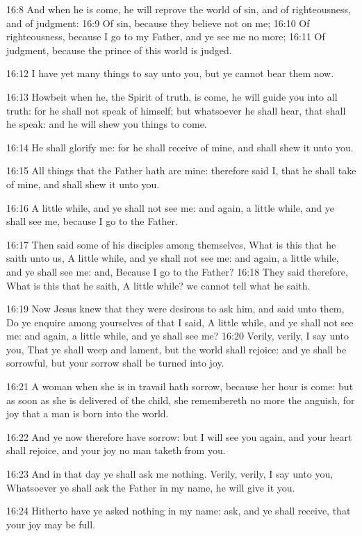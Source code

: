16:8 And when he is come, he will reprove the world of sin, and of
righteousness, and of judgment: 16:9 Of sin, because they believe not
on me; 16:10 Of righteousness, because I go to my Father, and ye see
me no more; 16:11 Of judgment, because the prince of this world is
judged.

16:12 I have yet many things to say unto you, but ye cannot bear them
now.

16:13 Howbeit when he, the Spirit of truth, is come, he will guide you
into all truth: for he shall not speak of himself; but whatsoever he
shall hear, that shall he speak: and he will shew you things to come.

16:14 He shall glorify me: for he shall receive of mine, and shall
shew it unto you.

16:15 All things that the Father hath are mine: therefore said I, that
he shall take of mine, and shall shew it unto you.

16:16 A little while, and ye shall not see me: and again, a little
while, and ye shall see me, because I go to the Father.

16:17 Then said some of his disciples among themselves, What is this
that he saith unto us, A little while, and ye shall not see me: and
again, a little while, and ye shall see me: and, Because I go to the
Father?  16:18 They said therefore, What is this that he saith, A
little while? we cannot tell what he saith.

16:19 Now Jesus knew that they were desirous to ask him, and said unto
them, Do ye enquire among yourselves of that I said, A little while,
and ye shall not see me: and again, a little while, and ye shall see
me?  16:20 Verily, verily, I say unto you, That ye shall weep and
lament, but the world shall rejoice: and ye shall be sorrowful, but
your sorrow shall be turned into joy.

16:21 A woman when she is in travail hath sorrow, because her hour is
come: but as soon as she is delivered of the child, she remembereth no
more the anguish, for joy that a man is born into the world.

16:22 And ye now therefore have sorrow: but I will see you again, and
your heart shall rejoice, and your joy no man taketh from you.

16:23 And in that day ye shall ask me nothing. Verily, verily, I say
unto you, Whatsoever ye shall ask the Father in my name, he will give
it you.

16:24 Hitherto have ye asked nothing in my name: ask, and ye shall
receive, that your joy may be full.

